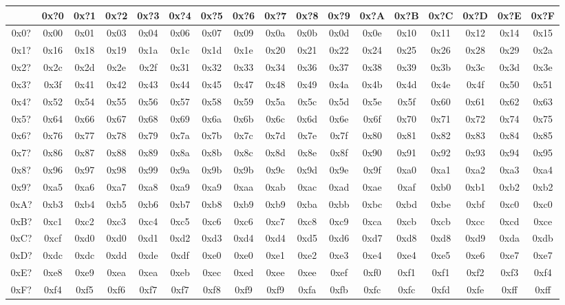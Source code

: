 {\ttfamily
\begin{tabular}{|c|c|c|c|c|c|c|c|c|c|c|c|c|c|c|c|c|}
\hline
& 0x?0 & 0x?1 & 0x?2 & 0x?3 & 0x?4 & 0x?5 & 0x?6 & 0x?7 & 0x?8 & 0x?9 & 0x?A & 0x?B & 0x?C & 0x?D & 0x?E & 0x?F \\
\hline
0x0? & 0x00 & 0x01 & 0x03 & 0x04 & 0x06 & 0x07 & 0x09 & 0x0a &
0x0b & 0x0d & 0x0e & 0x10 & 0x11 & 0x12 & 0x14 & 0x15 \\
0x1? & 0x16 & 0x18 & 0x19 & 0x1a & 0x1c & 0x1d & 0x1e & 0x20 &
0x21 & 0x22 & 0x24 & 0x25 & 0x26 & 0x28 & 0x29 & 0x2a \\
0x2? & 0x2c & 0x2d & 0x2e & 0x2f & 0x31 & 0x32 & 0x33 & 0x34 &
0x36 & 0x37 & 0x38 & 0x39 & 0x3b & 0x3c & 0x3d & 0x3e \\
0x3? & 0x3f & 0x41 & 0x42 & 0x43 & 0x44 & 0x45 & 0x47 & 0x48 &
0x49 & 0x4a & 0x4b & 0x4d & 0x4e & 0x4f & 0x50 & 0x51 \\
0x4? & 0x52 & 0x54 & 0x55 & 0x56 & 0x57 & 0x58 & 0x59 & 0x5a &
0x5c & 0x5d & 0x5e & 0x5f & 0x60 & 0x61 & 0x62 & 0x63 \\
0x5? & 0x64 & 0x66 & 0x67 & 0x68 & 0x69 & 0x6a & 0x6b & 0x6c &
0x6d & 0x6e & 0x6f & 0x70 & 0x71 & 0x72 & 0x74 & 0x75 \\
0x6? & 0x76 & 0x77 & 0x78 & 0x79 & 0x7a & 0x7b & 0x7c & 0x7d &
0x7e & 0x7f & 0x80 & 0x81 & 0x82 & 0x83 & 0x84 & 0x85 \\
0x7? & 0x86 & 0x87 & 0x88 & 0x89 & 0x8a & 0x8b & 0x8c & 0x8d &
0x8e & 0x8f & 0x90 & 0x91 & 0x92 & 0x93 & 0x94 & 0x95 \\
0x8? & 0x96 & 0x97 & 0x98 & 0x99 & 0x9a & 0x9b & 0x9b & 0x9c &
0x9d & 0x9e & 0x9f & 0xa0 & 0xa1 & 0xa2 & 0xa3 & 0xa4 \\
0x9? & 0xa5 & 0xa6 & 0xa7 & 0xa8 & 0xa9 & 0xa9 & 0xaa & 0xab &
0xac & 0xad & 0xae & 0xaf & 0xb0 & 0xb1 & 0xb2 & 0xb2 \\
0xA? & 0xb3 & 0xb4 & 0xb5 & 0xb6 & 0xb7 & 0xb8 & 0xb9 & 0xb9 &
0xba & 0xbb & 0xbc & 0xbd & 0xbe & 0xbf & 0xc0 & 0xc0 \\
0xB? & 0xc1 & 0xc2 & 0xc3 & 0xc4 & 0xc5 & 0xc6 & 0xc6 & 0xc7 &
0xc8 & 0xc9 & 0xca & 0xcb & 0xcb & 0xcc & 0xcd & 0xce \\
0xC? & 0xcf & 0xd0 & 0xd0 & 0xd1 & 0xd2 & 0xd3 & 0xd4 & 0xd4 &
0xd5 & 0xd6 & 0xd7 & 0xd8 & 0xd8 & 0xd9 & 0xda & 0xdb \\
0xD? & 0xdc & 0xdc & 0xdd & 0xde & 0xdf & 0xe0 & 0xe0 & 0xe1 &
0xe2 & 0xe3 & 0xe4 & 0xe4 & 0xe5 & 0xe6 & 0xe7 & 0xe7 \\
0xE? & 0xe8 & 0xe9 & 0xea & 0xea & 0xeb & 0xec & 0xed & 0xee &
0xee & 0xef & 0xf0 & 0xf1 & 0xf1 & 0xf2 & 0xf3 & 0xf4 \\
0xF? & 0xf4 & 0xf5 & 0xf6 & 0xf7 & 0xf7 & 0xf8 & 0xf9 & 0xf9 &
0xfa & 0xfb & 0xfc & 0xfc & 0xfd & 0xfe & 0xff & 0xff \\
\hline
\end{tabular}
}
